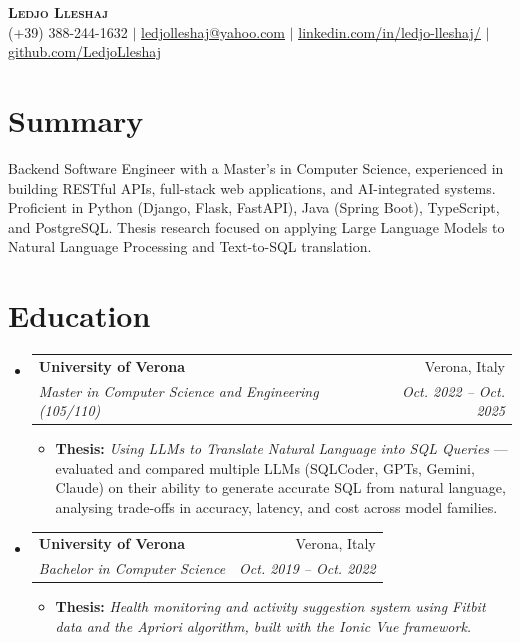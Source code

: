 \documentclass[a4paper,11pt]{article}
\makeatletter
\newcommand{\resumeItem}[1]{
  \item\small{
    {#1 \vspace{-2pt}}
  }
}
\newcommand{\resumeSubheading}[4]{
  \vspace{-2pt}\item
    \begin{tabular*}{0.97\textwidth}[t]{l@{\extracolsep{\fill}}r}
      \textbf{#1} & #2 \\
      \textit{\small#3} & \textit{\small #4} \\
    \end{tabular*}\vspace{-7pt}
}
\newcommand{\resumeSubHeadingListStart}{\begin{itemize}[leftmargin=0.15in, label={}]}
\newcommand{\resumeSubHeadingListEnd}{\end{itemize}}
\newcommand{\resumeItemListStart}{\begin{itemize}}
\newcommand{\resumeItemListEnd}{\end{itemize}\vspace{-5pt}}
\makeatother
\begin{document}
\begin{center}
    \textbf{\Huge \scshape Ledjo Lleshaj} \\ \vspace{1pt}
    \small (+39) 388-244-1632 $|$ \href{mailto:ledjolleshaj@yahoo.com}{\underline{ledjolleshaj@yahoo.com}} $|$
    \href{https://linkedin.com/in/ledjo-lleshaj/}{\underline{linkedin.com/in/ledjo-lleshaj/}} $|$
    \href{https://github.com/LedjoLleshaj}{\underline{github.com/LedjoLleshaj}}
\end{center}


\section{Summary}
\small{Backend Software Engineer with a Master's in Computer Science, experienced in building RESTful APIs, full-stack web applications, and AI-integrated systems. Proficient in Python (Django, Flask, FastAPI), Java (Spring Boot), TypeScript, and PostgreSQL. Thesis research focused on applying Large Language Models to Natural Language Processing and Text-to-SQL translation.}
\vspace{2pt}


\section{Education}
  \resumeSubHeadingListStart
    \resumeSubheading
        {University of Verona}{Verona, Italy}
        {Master in Computer Science and Engineering (105/110)}{Oct. 2022 -- Oct. 2025}

        \resumeItemListStart
          \resumeItem{\textbf{Thesis:} \emph{Using LLMs to Translate Natural Language into SQL Queries} --- evaluated and compared multiple LLMs (SQLCoder, GPTs, Gemini, Claude) on their ability to generate accurate SQL from natural language, analysing trade-offs in accuracy, latency, and cost across model families.}
        \resumeItemListEnd
    \resumeSubheading
      {University of Verona}{Verona, Italy}
      {Bachelor in Computer Science}{Oct. 2019 -- Oct. 2022}

      \resumeItemListStart
          \resumeItem{\textbf{Thesis:} \emph{Health monitoring and activity suggestion system using Fitbit data and the Apriori algorithm, built with the Ionic Vue framework.}}
      \resumeItemListEnd

  \resumeSubHeadingListEnd


\end{document}
